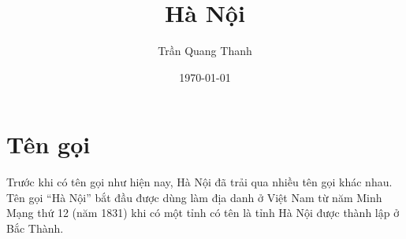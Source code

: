 \documentclass{article}
\title{Hà Nội}
\author{Trần Quang Thanh}
\date{\today}
\begin{document}
     
    \maketitle
     
    \section{Tên gọi}
     
    Trước khi có tên gọi như hiện nay, Hà Nội đã trải qua nhiều tên gọi khác nhau. Tên gọi “Hà Nội” bắt đầu được dùng làm địa danh ở Việt Nam từ năm Minh Mạng thứ 12 (năm 1831) khi có một tỉnh có tên là tỉnh Hà Nội được thành lập ở Bắc Thành. 
     
\end{document}
